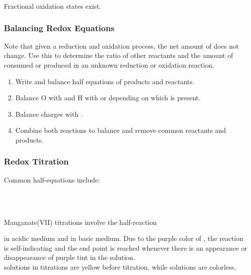 \documentclass[../main]{subfiles}
\begin{document}
	Fractional oxidation states exist.

	\subsubsection{Balancing Redox Equations}

	Note that given a reduction and oxidation process, the net amount of  does not change. Use this to determine the ratio of other reactants and the amount of  consumed or produced in an unknown reduction or oxidation reaction.

	\begin{enumerate}
		\item Write and balance half equations of products and reactants.
		\item Balance O with  and H with  or  depending on which is present.
		\item Balance charges with .
		\item Combine both reactions to balance  and remove common reactants and products.
	\end{enumerate}

	\subsubsection{Redox Titration}

	Common half-equations include:

	\begin{center}
		 \\
		 \\
	\end{center}

	Manganate(VII) titrations involve the half-reaction 
	\begin{center} \end{center}
	in acidic medium and  in basic medium. Due to the purple color of , the reaction is self-indicating and the end point is reached whenever there is an appearance or disappearance of purple tint in the solution.\\

	 solutions in  titrations are yellow before titration, while  solutions are colorless. \\
\end{document}
